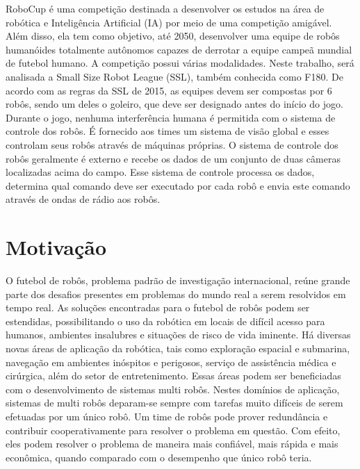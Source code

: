 RoboCup é uma competição destinada a desenvolver os estudos na área de robótica
e Inteligência Artificial (IA) por meio de uma competição amigável.  Além disso,
ela tem como objetivo, até 2050, desenvolver uma equipe de robôs humanóides
totalmente autônomos capazes de derrotar a equipe campeã mundial de futebol
humano.  A competição possui várias modalidades.  Neste trabalho, será analisada
a Small Size Robot League (SSL), também conhecida como F180.  De acordo com as
regras da SSL de 2015, as equipes devem ser compostas por 6 robôs, sendo um
deles o goleiro, que deve ser designado antes do início do jogo.  Durante o
jogo, nenhuma interferência humana é permitida com o sistema de controle dos
robôs.  É fornecido aos times um sistema de visão global e esses controlam seus
robôs através de máquinas próprias.  O sistema de controle dos robôs geralmente
é externo e recebe os dados de um conjunto de duas câmeras localizadas acima do
campo.  Esse sistema de controle processa os dados, determina qual comando deve
ser executado por cada robô e envia este comando através de ondas de rádio aos
robôs.

\section{Motivação}


O futebol de robôs, problema padrão de investigação internacional, reúne grande
parte dos desafios presentes em problemas do mundo real a serem resolvidos em
tempo real.  As soluções encontradas para o futebol de robôs podem ser
estendidas, possibilitando o uso da robótica em locais de difícil acesso para
humanos, ambientes insalubres e situações de risco de vida iminente.  Há
diversas novas áreas de aplicação da robótica, tais como exploração espacial e
submarina, navegação em ambientes inóspitos e perigosos, serviço de assistência
médica e cirúrgica, além do setor de entretenimento.  Essas áreas podem ser
beneficiadas com o desenvolvimento de sistemas multi robôs.  Nestes domínios de
aplicação, sistemas de multi robôs deparam-se sempre com tarefas muito difíceis
de serem efetuadas por um único robô.  Um time de robôs pode prover redundância
e contribuir cooperativamente para resolver o problema em questão.  Com efeito,
eles podem resolver o problema de maneira mais confiável, mais rápida e mais
econômica, quando comparado com o desempenho que único robô teria.

